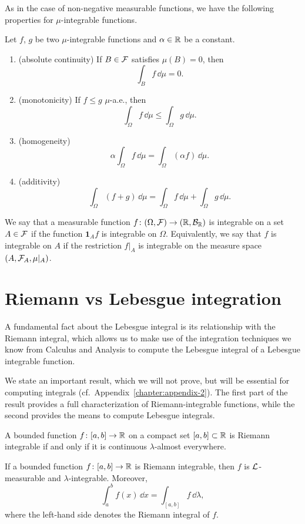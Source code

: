 As in the case of non-negative measurable functions, we have the following properties for $\mu$-integrable functions.

\begin{proposition}\label{prop:properties-integral}
	Let $f$, $g$ be two $\mu$-integrable functions and $\alpha \in \mathbb R$ be a constant.
	\begin{enumerate}
		\item (absolute continuity) If $B \in \mathcal F$ satisfies $\mu(B) = 0$, then
		\[
		\int_{B} f\, \dd \mu = 0. 
		\]
		\item (monotonicity) If $f \leq g$ $\mu$-a.e., then
		\[
		\int_\Omega f \,\dd \mu \leq \int_\Omega g \,\dd \mu.
		\]
		\item (homogeneity) 
		\[
		\alpha \int_\Omega f \,\dd \mu = \int_\Omega (\alpha f )\,\dd \mu.
		\]
		\item (additivity)
		\[
		\int_\Omega (f + g)\, \dd \mu = \int_\Omega f 
		\,\dd \mu + \int_\Omega g \,\dd \mu.
		\]	
	\end{enumerate}
\end{proposition}

\begin{definition}
We say that a measurable function $f\colon(\Omega, \mathcal F) \to (\mathbb R, \mathcal B_{\mathbb R})$ is integrable on a set $A \in \mathcal F$ if the function $\mathbf{1}_A f$ is integrable on $\Omega$. Equivalently, we say that $f$ is integrable on $A$ if the restriction $f|_A$ is integrable on the measure space $(A, \mathcal F_A, \mu|_A)$. 
\end{definition}

\section{Riemann vs Lebesgue integration}

A fundamental fact about the Lebesgue integral is its relationship with the Riemann integral, which allows us to make use of the integration techniques we know from Calculus and Analysis to compute the Lebesgue integral of a Lebesgue integrable function.

We state an important result, which we will not prove, but will be essential for computing integrals (cf.\ Appendix~\ref{chapter:appendix-2}). The first part of the result provides a full characterization of Riemann-integrable functions, while the second provides the means to compute Lebesgue integrals.

\begin{theorem}\label{thm:riem-leb}
	A bounded function $f\colon [a,b] \to \mathbb R$ on a compact set $[a,b]\subset\mathbb R$ is Riemann integrable if and only if it is continuous $\lambda$-almost everywhere.
	
	If a bounded function $f\colon [a,b] \to \mathbb R$ is Riemann integrable, then $f$ is $\mathcal L$-measurable and $\lambda$-integrable. Moreover,
	\[
		\int_a^b f(x) \,\dd x = \int_{[a,b]} f \,\dd \lambda,
	\]
	where the left-hand side denotes the Riemann integral of $f$.
\end{theorem}

